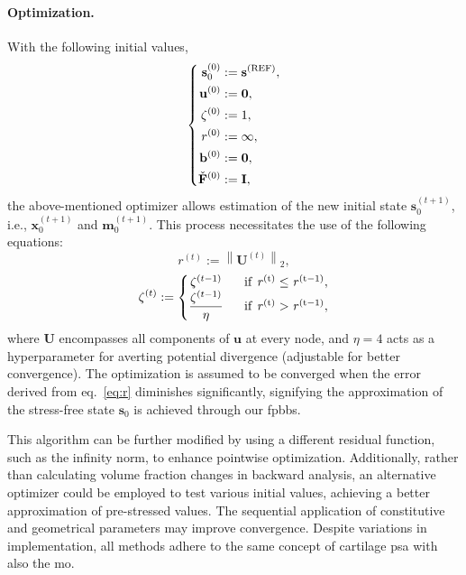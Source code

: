 \paragraph{Optimization.} With the following initial values,
%
\begin{equation}
\left\{
\begin{aligned}
    \mathbf{s}_{0}^{(0)} &:= \mathbf{s}^{\rm{(REF)}}, \\
    \mathbf{u}^{(0)} &:= \mathbf{0}, \\
    \zeta^{(0)} &:= 1, \\
    r^{(0)} &:= \infty, \\
    \mathbf{b}^{(0)} &:= \mathbf{0}, \\
    \check{\mathbf{F}}^{(0)} &:= \mathbf{I},
\end{aligned}
\right.
\end{equation}
%
the above-mentioned optimizer allows estimation of the new initial state $\mathbf{s}_{0}^{(t+1)}$, i.e., $\mathbf{x}_{0}^{(t+1)}$ and $\mathbf{m}_{0}^{(t+1)}$. This process necessitates the use of the following equations:
%
\begin{equation}\label{eq:r}
    r^{(t)} := \left \| \mathbf{U}^{(t)} \right \|_2,
\end{equation}
%
\begin{equation}
    \zeta^{(t)} := \left\{\begin{matrix}
    \zeta^{(t-1)}  & \ \ \rm{if} \ \mathit{r}^{(t)} \leq \mathit{r}^{(t-1)},\\ 
    \displaystyle \frac{\zeta^{(t-1)}}{\eta} & \ \ \rm{if} \ \mathit{r}^{(t)} > \mathit{r}^{(t-1)},
    \end{matrix}\right.
\end{equation}
%
where $\mathbf{U}$ encompasses all components of $\mathbf{u}$ at every node, and $\eta=4$ acts as a hyperparameter for averting potential divergence (adjustable for better convergence). The optimization is assumed to be converged when the error derived from eq.~\ref{eq:r} diminishes significantly, signifying the approximation of the stress-free state $\mathbf{s}_0$ is achieved through our \ac{fpbbs}.

This algorithm can be further modified by using a different residual function, such as the infinity norm, to enhance pointwise optimization. Additionally, rather than calculating volume fraction changes in backward analysis, an alternative optimizer could be employed to test various initial values, achieving a better approximation of pre-stressed values. The sequential application of constitutive and geometrical parameters may improve convergence. Despite variations in implementation, all methods adhere to the same concept of cartilage \ac{psa} with also the \ac{mo}.

